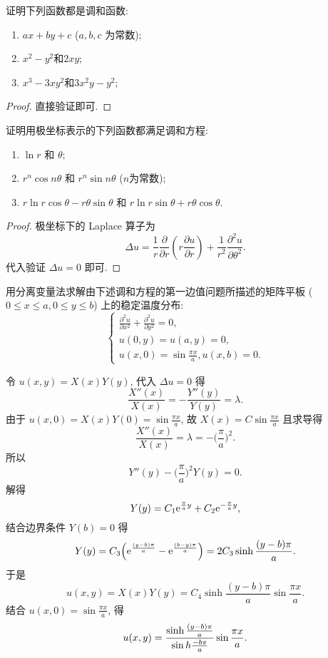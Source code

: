 \begin{exercise}
  证明下列函数都是调和函数:
  \begin{enumerate}[(1)]
    \item $ax+by+c$ ($a,b,c$ 为常数);
    \item $x^2-y^2$和$2xy$;
    \item $x^3-3xy^2$和$3x^2y-y^2$;
  \end{enumerate}
\end{exercise}

\begin{proof}
  直接验证即可.
\end{proof}



\begin{exercise}
  证明用极坐标表示的下列函数都满足调和方程:
  \begin{enumerate}[(1)]
    \item $\ln r$ 和 $\theta$;
    \item $r^n\cos n\theta$ 和 $r^n\sin n\theta$ ($n$为常数);
    \item $r\ln r\cos\theta-r\theta\sin\theta$ 和 $r\ln r\sin\theta+r\theta\cos\theta$.
  \end{enumerate}
\end{exercise}

\begin{proof}
  极坐标下的 Laplace 算子为
  \[\Delta u = \frac{1}{r}\frac{\partial}{\partial r}\left(r\frac{\partial u}{\partial r}\right)
    + \frac{1}{r^2}\frac{\partial^2u}{\partial\theta^2}.\]
  代入验证 $\Delta u=0$ 即可.
\end{proof}


\begin{exercise}
  用分离变量法求解由下述调和方程的第一边值问题所描述的矩阵平板 ($0\leq x\leq a,0\leq y\leq b$)
  上的稳定温度分布:
  \[\begin{cases}
    \frac{\partial^2u}{\partial x^2}+\frac{\partial^2u}{\partial y^2}=0,\\
    u(0,y)=u(a,y)=0,\\
    u(x,0)=\sin\frac{\pi x}{a},u(x,b)=0.
  \end{cases}\]
\end{exercise}

\begin{solve}
  令 $u(x,y)=X(x)Y(y)$, 代入 $\Delta u=0$ 得
  \[\frac{X''(x)}{X(x)} = -\frac{Y''(y)}{Y(y)} = \lambda.\]
  由于 $u(x,0) = X(x)Y(0) = \sin\frac{\pi x}{a}$, 故 $X(x) = C\sin\frac{\pi x}{a}$ 且求导得
  \[\frac{X''(x)}{X(x)} = \lambda = -\biggl(\frac{\pi}{a}\biggr)^2.\]
  所以
  \[Y''(y) - \biggl(\frac{\pi}{a}\biggr)^2 Y(y) = 0.\]
  解得
  \[Y(y) = C_1 \mathrm{e}^{\frac{\pi}{a}y} + C_2 \mathrm{e}^{-\frac{\pi}{a}y},\]
  结合边界条件 $Y(b) = 0$ 得
  \[Y(y) = C_3 \Bigl(\mathrm{e}^{\frac{(y-b)\pi}{a}} - \mathrm{e}^{\frac{(b-y)\pi}{a}}\Bigr)
    = 2C_3 \sinh\frac{(y-b)\pi}{a}.\]
  于是
  \[u(x,y) = X(x)Y(y) = C_4 \sinh\frac{(y-b)\pi}{a} \sin\frac{\pi x}{a}.\]
  结合 $u(x,0) = \sin\frac{\pi x}{a}$, 得
  \[u(x,y) = \frac{\sinh \frac{(y-b)\pi}{a}}{\sin h \frac{-b\pi}{a}} \sin\frac{\pi x}{a}.\qedhere\]
\end{solve}


